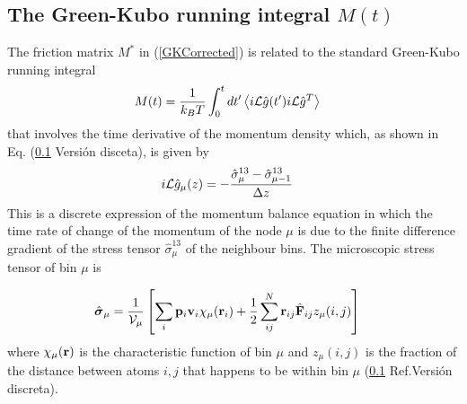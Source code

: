 \documentclass[b5paper,openright,11pt]{book}
\newcommand{\Pendiente}[1]{{\color{green}#1}} %
\newcommand{\llangle}{\left\langle}
\newcommand{\rrangle}{\right\rangle}
\begin{document}
\subsection{The Green-Kubo running integral $M(t)$}
The friction matrix $M^*$ in (\ref{GKCorrected}) is
related to the standard Green-Kubo running integral
\begin{align}
M(t)&=\frac{1}{k_BT}\int_0^{t}dt' \llangle i{\cal L}\hat{g}(t')i{\cal L}\hat{g}^T\rrangle
\label{Mmunu}
\end{align}
that  involves the  time
derivative of the  momentum density which, as shown  in Eq. \Pendiente{(\ref{} Versión disceta)}, is
given by
\begin{align}
  i{\cal L}  \hat{g}_{\mu}(z)&=-\frac{\hat{\sigma}^{13}_{\mu}-\hat{\sigma}^{13}_{\mu-1}}{\Delta z}
\label{iLAcurrentx}
\end{align}
This  is a  discrete expression  of the  momentum balance  equation in
which the time rate of change of the momentum of the node $\mu$ is due
to   the   finite   difference   gradient   of   the   stress   tensor
$\hat{\sigma}^{13}_{\mu}$  of  the  neighbour bins.   The 
microscopic   stress   tensor   of  bin $\mu$ is 

\begin{align}
 \hat{ \boldsymbol{\sigma}}_{\mu}
&=
\frac{1}{{\cal V}_\mu} \left[\sum_i{\bf p}_i{\bf v}_i\chi_\mu({\bf r}_i)
+\frac{1}{2}\sum^{N}_{ij}{\bf r}_{ij}\hat{\bf F}_{ij}z_\mu(i,j)\right]
\label{sbin}
\end{align}
where $\chi_\mu({\bf r})$ is the  characteristic function of bin $\mu$
and $z_{\mu}(i,j)$ is the fraction of the distance between atoms $i,j$
that happens to be within bin $\mu$ (\Pendiente{\ref{} Ref.Versión discreta}).
\end{document}
